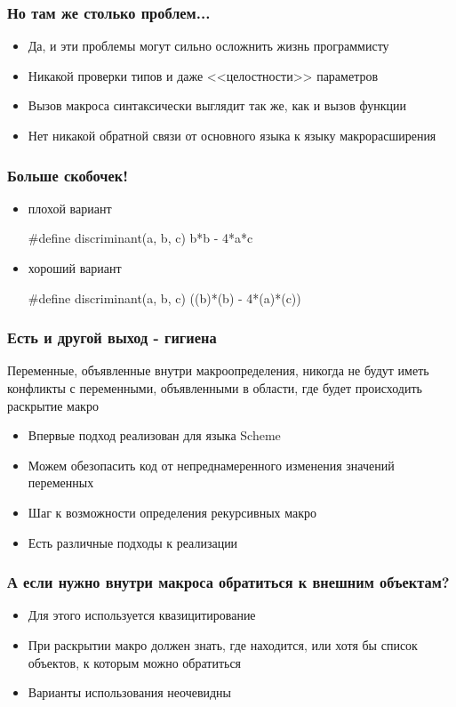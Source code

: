 \documentclass[11pt]{beamer}
\begin{document}
\begin{frame}
\frametitle{Но там же столько проблем...}

\begin{itemize}
	\item Да, и эти проблемы могут сильно осложнить жизнь программисту
	\item Никакой проверки типов и даже <<целостности>> параметров
	\item Вызов макроса синтаксически выглядит так же, как и вызов функции
	\item Нет никакой обратной связи от основного языка к языку макрорасширения
\end{itemize}

\end{frame}


\begin{frame}
\frametitle{Больше скобочек!}

\begin{itemize}
\item плохой вариант
 
\#define discriminant(a, b, c) b*b - 4*a*c

\item хороший вариант

\#define discriminant(a, b, c) ((b)*(b) - 4*(a)*(c))
\end{itemize}

\end{frame}

\begin{frame}
\frametitle{Есть и другой выход - гигиена}

Переменные, объявленные внутри макроопределения, никогда не будут иметь конфликты с переменными, объявленными в области, где будет происходить раскрытие макро

\begin{itemize}
\item Впервые подход реализован для языка Scheme
\item Можем обезопасить код от непреднамеренного изменения значений переменных
\item Шаг к возможности определения рекурсивных макро
\item Есть различные подходы к реализации
\end{itemize}

\end{frame}

\begin{frame}
\frametitle{А если нужно внутри макроса обратиться к внешним объектам?}

\begin{itemize}
\item Для этого используется квазицитирование
\item При раскрытии макро должен знать, где находится, или хотя бы список объектов, к которым можно обратиться
\item Варианты использования неочевидны
\end{itemize}

\end{frame}
\end{document}
